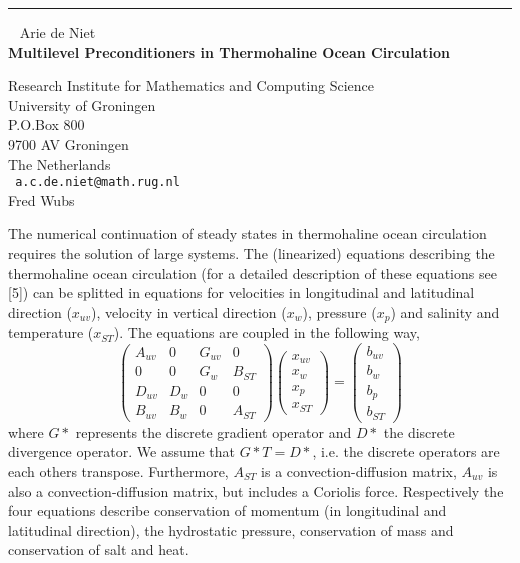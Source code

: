 \documentclass{report}
\begin{document}
\begin{center}

\rule{6in}{1pt} \
{\large
Arie de Niet
\\ {\bf
Multilevel Preconditioners in Thermohaline Ocean Circulation
}}

Research Institute for Mathematics and Computing Science
\\
University of Groningen
\\
P.O.Box 800 \\
9700 AV Groningen \\
The Netherlands
\\ {\tt
a.c.de.niet@math.rug.nl
}
\\
Fred Wubs
\end{center}

The numerical continuation of steady states in thermohaline ocean
circulation requires the solution of large systems. The (linearized)
equations describing the thermohaline ocean circulation (for a detailed
description of these equations see [5]) can be splitted in equations
for velocities in longitudinal and latitudinal direction ($x_{uv}$),
velocity in vertical direction ($x_w$), pressure ($x_p$) and salinity and
temperature ($x_{ST}$). The equations are coupled in the following way,
$$ \left( \begin{array}{cccc}
A_{uv} & 0 & G_{uv} & 0 \\
0 & 0 & G_w & B_{ST} \\
D_{uv} & D_w & 0 & 0 \\
B_{uv} & B_w & 0 & A_{ST}
\end{array}\right)
\left( \begin{array}{c}
	x_{uv} \\ x_{w} \\ x_{p} \\ x_{ST}
	\end{array}\right)
= \left( \begin{array}{c}
	b_{uv} \\ b_{w} \\ b_{p} \\ b_{ST}
	\end{array}\right)
$$
where $G*$ represents the discrete gradient operator and $D*$ the discrete
divergence operator. We assume that $G*T=D*$, i.e. the discrete operators
are each others transpose. Furthermore, $A_{ST}$ is a convection-diffusion
matrix, $A_{uv}$ is also a convection-diffusion matrix, but includes a
Coriolis force. Respectively the four equations describe conservation
of momentum (in longitudinal and latitudinal direction), the
hydrostatic pressure, conservation of mass and conservation of salt and
heat.
\end{document}
